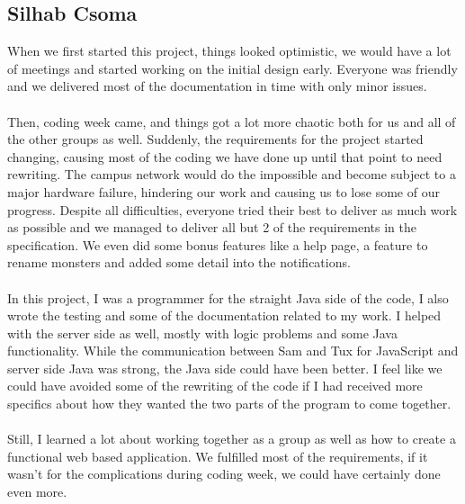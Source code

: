 \documentclass{project}
\begin{document}
\subsection{Silhab Csoma}
When we first started this project, things looked optimistic, we would have a lot of meetings and started working on the initial design early. Everyone was friendly and we delivered most of the documentation in time with only minor issues. 
\\\\
Then, coding week came, and things got a lot more chaotic both for us and all of the other groups as well. Suddenly, the requirements for the project started changing, causing most of the coding we have done up until that point to need rewriting. The campus network would do the impossible and become subject to a major hardware failure, hindering our work and causing us to lose some of our progress. Despite all difficulties, everyone tried their best to deliver as much work as possible and we managed to deliver all but 2 of the requirements in the specification. We even did some bonus features like a help page, a feature to rename monsters and added some detail into the notifications.
\\\\
In this project, I was a programmer for the straight Java side of the code, I also wrote the testing and some of the documentation related to my work.  I helped with the server side as well, mostly with logic problems and some Java functionality. While the communication between Sam and Tux for JavaScript and server side Java was strong, the Java side could have been better. I feel like we could have avoided some of the rewriting of the code if I had received more specifics about how they wanted the two parts of the program to come together.
\\\\
Still, I learned a lot about working together as a group as well as how to create a functional web based application. We fulfilled most of the requirements, if it wasn’t for the complications during coding week, we could have certainly done even more.
\end{document}
